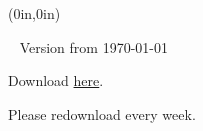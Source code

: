 \documentclass[openany,oneside]{memoir}
\begin{document}
\thispagestyle{empty}
\begin{textblock*}{0in}(0in,0in)
  \noindent\hfill
  \begin{minipage}[b][\stockheight][s]{.9\stockwidth}
  \end{minipage}
  \hspace*{1cm}
\end{textblock*}
\
    \vfill
    \noindent Version from \today\par
    \noindent Download \href{https://catrincm.github.io/forallx-bris/forallxbris.pdf}{here}. \par 
    \noindent Please redownload every week.\par
\newpage\color{black}





\midsloppy





\end{document}
